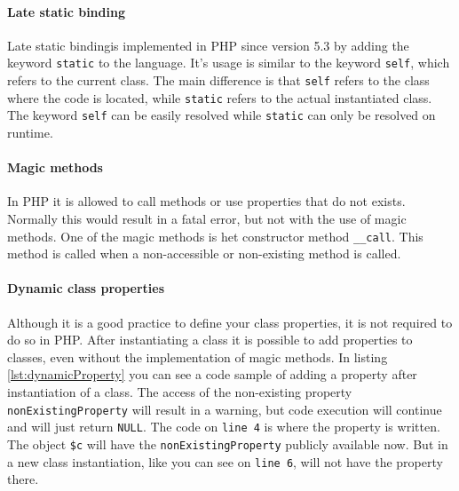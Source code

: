 \documentclass[../main.tex]{subfiles}
\begin{document}
    \paragraph{Late static binding}
    Late static binding\footnotemark is implemented in PHP since version 5.3 by adding the keyword \texttt{static} to the language.
    It's usage is similar to the keyword \texttt{self}, which refers to the current class. 
    The main difference is that \texttt{self} refers to the class where the code is located, while \texttt{static} refers to the actual instantiated class.
    The keyword \texttt{self} can be easily resolved while \texttt{static} can only be resolved on runtime.
    
    \paragraph{Magic methods}
    In PHP it is allowed to call methods or use properties that do not exists.
    Normally this would result in a fatal error, but not with the use of magic methods.
    One of the magic methods is het constructor method \texttt{\_\_{}call}.
    This method is called when a non-accessible or non-existing method is called.

    \paragraph{Dynamic class properties}
    Although it is a good practice to define your class properties, it is not required to do so in PHP.
    After instantiating a class it is possible to add properties to classes, even without the implementation of magic methods.
    In listing \ref{lst:dynamicProperty} you can see a code sample of adding a property after instantiation of a class.
    The access of the non-existing property \texttt{nonExistingProperty} will result in a warning, but code execution will continue and will just return \texttt{NULL}.
    The code on \texttt{line 4} is where the property is written.
    The object \texttt{\$c} will have the \texttt{nonExistingProperty} publicly available now.
    But in a new class instantiation, like you can see on \texttt{line 6}, will not have the property there.
    
    
    
\end{document}
